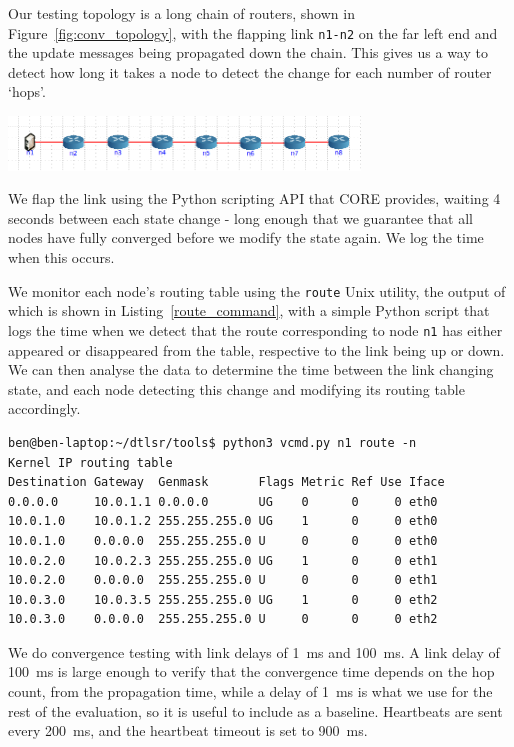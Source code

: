 \documentclass[withindex,glossary,openany]{cam-thesis}
\begin{document}
Our testing topology is a long chain of routers, shown in Figure~\ref{fig:conv_topology}, with the flapping link \texttt{n1-n2} on the far left end and the update messages being propagated down the chain. This gives us a way to detect how long it takes a node to detect the change for each number of router `hops'.

\begin{minipage}{1\textwidth} \centering
	\includegraphics[width=0.7\textwidth]{conv_topology}
	\label{fig:conv_topology}
\end{minipage}

We flap the link using the Python scripting API that CORE provides, waiting 4 seconds between each state change - long enough that we guarantee that all nodes have fully converged before we modify the state again. We log the time when this occurs.

We monitor each node's routing table using the \texttt{route} Unix utility, the output of which is shown in Listing~\ref{route_command}, with a simple Python script that logs the time when we detect that the route corresponding to node \texttt{n1} has either appeared or disappeared from the table, respective to the link being up or down. We can then analyse the data to determine the time between the link changing state, and each node detecting this change and modifying its routing table accordingly.

\begin{lstlisting}[label=route_command, caption=Example routing table of virtualised node, frame=tb]
ben@ben-laptop:~/dtlsr/tools$ python3 vcmd.py n1 route -n
Kernel IP routing table
Destination Gateway  Genmask       Flags Metric Ref Use Iface
0.0.0.0     10.0.1.1 0.0.0.0       UG    0      0     0 eth0
10.0.1.0    10.0.1.2 255.255.255.0 UG    1      0     0 eth0
10.0.1.0    0.0.0.0  255.255.255.0 U     0      0     0 eth0
10.0.2.0    10.0.2.3 255.255.255.0 UG    1      0     0 eth1
10.0.2.0    0.0.0.0  255.255.255.0 U     0      0     0 eth1
10.0.3.0    10.0.3.5 255.255.255.0 UG    1      0     0 eth2
10.0.3.0    0.0.0.0  255.255.255.0 U     0      0     0 eth2
\end{lstlisting}

We do convergence testing with link delays of \SI{1}{\ms} and \SI{100}{\ms}. A link delay of \SI{100}{\ms} is large enough to verify that the convergence time depends on the hop count, from the propagation time, while a delay of \SI{1}{\ms} is what we use for the rest of the evaluation, so it is useful to include as a baseline.  Heartbeats are sent every \SI{200}{\ms}, and the heartbeat timeout is set to \SI{900}{\ms}.
\end{document}
